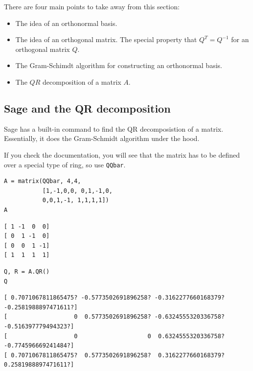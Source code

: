 \documentclass[10pt,]{book}
\theoremstyle{plain}
\theoremstyle{definition}
\numberwithin{equation}{section}
\begin{document}
      There are four main points to take away from this section:
      \begin{itemize}
\item{}The idea of an orthonormal basis.\item{}The idea of an orthogonal matrix. The special property that
          \(Q^T = Q^{-1}\) for an orthogonal matrix \(Q\).
        \item{}The Gram-Schimdt algorithm for constructing an orthonormal basis.\item{}The \(QR\) decomposition of a matrix \(A\).\end{itemize}

\typeout{************************************************}
\typeout{************************************************}
\subsection[Sage and the QR decomposition]{Sage and the QR decomposition}\label{subsection-111}

      Sage has a built-in command to find the QR decomposistion of a matrix.
      Essentially, it does the Gram-Schmidt algorithm under the hood.
\par

      If you check the documentation, you will see that the matrix has to be defined
      over a special type of ring, so use \verb?QQbar?.
\begin{lstlisting}[style=sageinput]
A = matrix(QQbar, 4,4,
           [1,-1,0,0, 0,1,-1,0,
           0,0,1,-1, 1,1,1,1])
A
\end{lstlisting}
\begin{lstlisting}[style=sageoutput]
[ 1 -1  0  0]
[ 0  1 -1  0]
[ 0  0  1 -1]
[ 1  1  1  1]
\end{lstlisting}
\begin{lstlisting}[style=sageinput]
Q, R = A.QR()
Q
\end{lstlisting}
\begin{lstlisting}[style=sageoutput]
[ 0.7071067811865475? -0.5773502691896258? -0.3162277660168379? -0.2581988897471611?]
[                   0  0.5773502691896258? -0.6324555320336758?  -0.516397779494323?]
[                   0                    0  0.6324555320336758?  -0.774596669241484?]
[ 0.7071067811865475?  0.5773502691896258?  0.3162277660168379?  0.2581988897471611?]
\end{lstlisting}
\par
\end{document}
